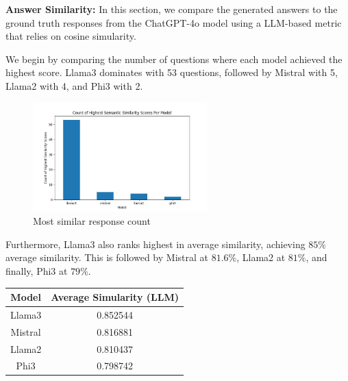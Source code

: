 \documentclass[]{article}
\begin{document}
\textbf{Answer Similarity:} 
In this section, we compare the generated answers to the ground truth responses from the ChatGPT-4o model using a LLM-based metric that relies on cosine simularity.  

We begin by comparing the number of questions where each model achieved the highest score. Llama3 dominates with 53 questions, 
followed by Mistral with 5, Llama2 with 4, and Phi3 with 2.

\begin{figure}[H]
    \centering
    \includegraphics[width=0.6\textwidth]{./images/highest_count_zara.jpg}
    \caption{Most similar response count}
    \label{fig:image_label}
\end{figure}

Furthermore, Llama3 also ranks highest in average similarity, achieving $85\%$ average similarity. This is followed by Mistral at $81.6\%$, Llama2 at $81\%$, and finally, Phi3 at $79\%$.

\begin{center}
    \begin{tabular}{||c c||} 
     \hline
     \textbf{Model} & \textbf{Average Simularity (LLM)}  \\ [0.5ex] 
     \hline
     Llama3 & 0.852544\\ 
     \hline
     Mistral & 0.816881\\ 
     \hline
     Llama2 & 0.810437 \\
     \hline
     Phi3 & 0.798742\\
     \hline
    \end{tabular}
\end{center}
\end{document}
